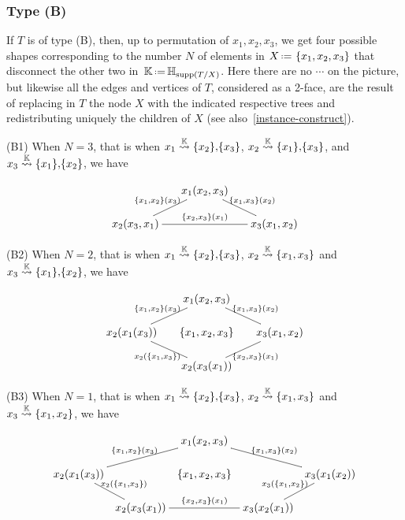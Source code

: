 \subsubsection*{Type (B)}
\label{ss:typeB}
If $T$ is of type (B), then, up to permutation of $x_1,x_2,x_3$, we get four possible shapes corresponding to the number $N$ of  elements in $X\eqdef \set{x_1,x_2,x_3}$ that disconnect the other two in~$\hyper{K}\eqdef \hyper{H}_{\supp(\occ{T}{X})}$.
Here there are no $\cdots$ on the picture, but likewise all the edges and vertices of $T$, considered as a 2-face, are the result of replacing in $T$ the node $X$ with the indicated respective trees and redistributing uniquely the  children of $X$ (see also~\cref{instance-construct}). 
 
\smallskip\noindent
(B1)  When $N=3$, that is when $x_1\stackrel{{\mathbb K}}{\rightsquigarrow}\left\{x_2\right\}\!,\! \left\{x_3\right\}$, $x_2\stackrel{{\mathbb K}}{\rightsquigarrow}\left\{x_1\right\}\!,\! \left\{x_3\right\}$, and
 $x_3\stackrel{{\mathbb K}}{\rightsquigarrow}\left\{x_1\right\}\!,\! \left\{x_2\right\}$, we have
 
 $$\xymatrix @-1.65pc {&& x_1(x_2,x_3) \ar @{-}[ddll]_{\set{x_1,x_2}(x_3)} \ar @{-}[ddrr]^{\set{x_1,x_3}(x_2)}&& \\
 &&&&\\
 x_2(x_3,x_1) \ar @{-}[rrrr]^{\set{x_2,x_3}(x_1)} &&&& x_3(x_1,x_2)}$$

\smallskip\noindent
(B2) When $N=2$, that is when $x_1\stackrel{{\mathbb K}}{\rightsquigarrow}\left\{x_2\right\}\!,\! \left\{x_3\right\}$, $x_2\stackrel{{\mathbb K}}{\rightsquigarrow}\left\{x_1,x_3\right\}$ and
 $x_3\stackrel{{\mathbb K}}{\rightsquigarrow}\left\{x_1\right\}\!,\! \left\{x_2\right\}$, we have
 
 $$ \xymatrix @-1.65pc {&& x_1(x_2,x_3) \ar @{-}[ddll]_{\set{x_1,x_2}(x_3)} \ar @{-}[ddrr]^{\set{x_1,x_3}(x_2)}&& \\
 &&&&\\
 x_2(x_1(x_3)) \ar @{-}[ddrr]_{x_2(\set{x_1,x_3})}&& \set{x_1,x_2,x_3}  && x_3(x_1,x_2)\ar @{-}[ddll]^{\set{x_2,x_3}(x_1)}\\
 &&&&\\
 &&  x_2(x_3(x_1))&&}$$

\smallskip\noindent
(B3) When $N=1$, that is when $x_1\stackrel{{\mathbb K}}{\rightsquigarrow}\left\{x_2\right\}\!,\! \left\{x_3\right\}$, $x_2\stackrel{{\mathbb K}}{\rightsquigarrow}\left\{x_1,x_3\right\}$ and
 $x_3\stackrel{{\mathbb K}}{\rightsquigarrow}\left\{x_1,x_2\right\}$, we have
 
$$
 \xymatrix @-1.65pc {&& x_1(x_2,x_3) \ar @{-}[ddll]_{\set{x_1,x_2}(x_3)} \ar @{-}[ddrr]^{\set{x_1,x_3}(x_2)}&& \\
 &&&&\\
 x_2(x_1(x_3)) \ar @{-}[ddr]^{x_2(\set{x_1,x_3})}&& \set{x_1,x_2,x_3}  && x_3(x_1(x_2))\ar @{-}[ddl]_{x_3(\set{x_1,x_2})}\\
 &&&&\\
 &x_2(x_3(x_1))\ar @{-}[rr]^{\set{x_2,x_3}(x_1)}&  & x_3(x_2(x_1))&}
$$


